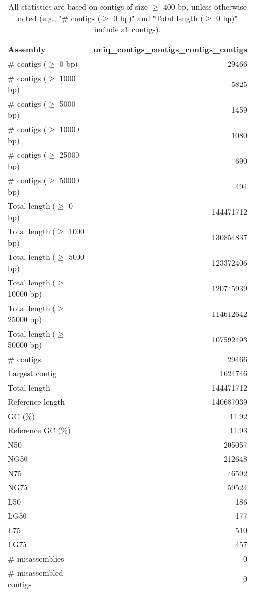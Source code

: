 \documentclass[12pt,a4paper]{article}
\begin{document}
\begin{table}[ht]
\begin{center}
\caption{All statistics are based on contigs of size $\geq$ 400 bp, unless otherwise noted (e.g., "\# contigs ($\geq$ 0 bp)" and "Total length ($\geq$ 0 bp)" include all contigs).}
\begin{tabular}{|l*{1}{|r}|}
\hline
Assembly & uniq\_contigs\_contigs\_contigs\_contigs \\ \hline
\# contigs ($\geq$ 0 bp) & 29466 \\ \hline
\# contigs ($\geq$ 1000 bp) & 5825 \\ \hline
\# contigs ($\geq$ 5000 bp) & 1459 \\ \hline
\# contigs ($\geq$ 10000 bp) & 1080 \\ \hline
\# contigs ($\geq$ 25000 bp) & 690 \\ \hline
\# contigs ($\geq$ 50000 bp) & 494 \\ \hline
Total length ($\geq$ 0 bp) & 144471712 \\ \hline
Total length ($\geq$ 1000 bp) & 130854837 \\ \hline
Total length ($\geq$ 5000 bp) & 123372406 \\ \hline
Total length ($\geq$ 10000 bp) & 120745939 \\ \hline
Total length ($\geq$ 25000 bp) & 114612642 \\ \hline
Total length ($\geq$ 50000 bp) & 107592493 \\ \hline
\# contigs & 29466 \\ \hline
Largest contig & 1624746 \\ \hline
Total length & 144471712 \\ \hline
Reference length & 140687039 \\ \hline
GC (\%) & 41.92 \\ \hline
Reference GC (\%) & 41.93 \\ \hline
N50 & 205057 \\ \hline
NG50 & 212648 \\ \hline
N75 & 46592 \\ \hline
NG75 & 59524 \\ \hline
L50 & 186 \\ \hline
LG50 & 177 \\ \hline
L75 & 510 \\ \hline
LG75 & 457 \\ \hline
\# misassemblies & 0 \\ \hline
\# misassembled contigs & 0 \\ \hline

\end{tabular}
\end{center}
\end{table}
\end{document}
